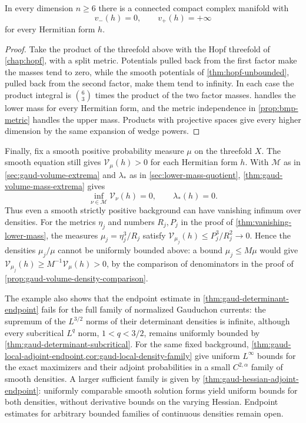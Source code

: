 \begin{corollary}\label{cor:both-mass-properties-fail}
In every dimension $n\geq6$ there is a connected compact complex manifold with
\[
 v_-(h)=0,\qquad v_+(h)=+\infty
\]
for every Hermitian form $h$.
\end{corollary}
\begin{proof}
Take the product of the threefold above with the Hopf threefold of \cref{chap:hopf}, with a split metric. Potentials pulled back from the first factor make the masses tend to zero, while the smooth potentials of \cref{thm:hopf-unbounded}, pulled back from the second factor, make them tend to infinity. In each case the product integral is $\binom63$ times the product of the two factor masses.  handles the lower mass for every Hermitian form, and the metric independence in \cref{prop:bmp-metric} handles the upper mass. Products with projective spaces give every higher dimension by the same expansion of wedge powers.
\end{proof}

Finally, fix a smooth positive probability measure $\mu$ on the threefold $X$. The smooth equation still gives $\mathcal V_\mu(h)>0$ for each Hermitian form $h$. With $\mathscr M$ as in \cref{sec:gaud-volume-extrema} and $\lambda_*$ as in \cref{sec:lower-mass-quotient}, \cref{thm:gaud-volume-mass-extrema} gives
\[
 \inf_{\nu\in\mathscr M}\mathcal V_\nu(h)=0,
 \qquad \lambda_*(h)=0.
\]
Thus even a smooth strictly positive background can have vanishing infimum over densities. For the metrics $\eta_j$ and numbers $R_j,P_j$ in the proof of \cref{thm:vanishing-lower-mass}, the measures $\mu_j=\eta_j^3/R_j$ satisfy
$\mathcal V_{\mu_j}(h)\leq P_j^3/R_j^2\to0$.
Hence the densities $\mu_j/\mu$ cannot be uniformly bounded above: a bound $\mu_j\leq M\mu$ would give $\mathcal V_{\mu_j}(h)\geq M^{-1}\mathcal V_\mu(h)>0$, by the comparison of denominators in the proof of \cref{prop:gaud-volume-density-comparison}.

The example also shows that the endpoint estimate in \cref{thm:gaud-determinant-endpoint} fails for the full family of normalized Gauduchon currents: the supremum of the $L^{3/2}$ norms of their determinant densities is infinite, although every subcritical $L^q$ norm, $1<q<3/2$, remains uniformly bounded by \cref{thm:gaud-determinant-subcritical}. For the same fixed background, \cref{thm:gaud-local-adjoint-endpoint,cor:gaud-local-density-family} give uniform $L^\infty$ bounds for the exact maximizers and their adjoint probabilities in a small $C^{2,\alpha}$ family of smooth densities. A larger sufficient family is given by \cref{thm:gaud-hessian-adjoint-endpoint}: uniformly comparable smooth solution forms yield uniform bounds for both densities, without derivative bounds on the varying Hessian. Endpoint estimates for arbitrary bounded families of continuous densities remain open.
